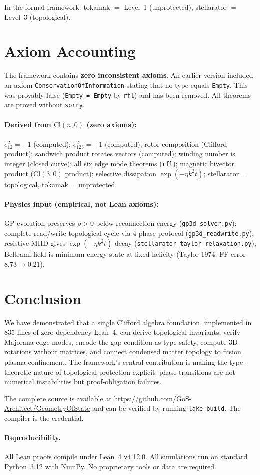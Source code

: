 \documentclass[11pt,a4paper]{article}
\newcommand{\Cl}[1]{\mathrm{Cl}(#1)}
\newcommand{\eonetwo}{e_{12}}
\newcommand{\eonetwothree}{e_{123}}
\begin{document}
In the formal framework: tokamak $=$ Level~1 (unprotected), stellarator $=$ Level~3 (topological).

\section{Axiom Accounting}

The framework contains \textbf{zero inconsistent axioms}. An earlier version included an axiom \texttt{ConservationOfInformation} stating that no type equals \texttt{Empty}. This was provably false (\texttt{Empty = Empty} by \texttt{rfl}) and has been removed. All theorems are proved without \texttt{sorry}.

\paragraph{Derived from $\Cl{n,0}$ (zero axioms):}
$\eonetwo^2 = -1$ (computed); $\eonetwothree^2 = -1$ (computed); rotor composition (Clifford product); sandwich product rotates vectors (computed); winding number is integer (closed curve); all six edge mode theorems (\texttt{rfl}); magnetic bivector product ($\Cl{3,0}$ product); selective dissipation $\exp(-\eta k^2 t)$; stellarator = topological, tokamak = unprotected.

\paragraph{Physics input (empirical, not Lean axioms):}
GP evolution preserves $\rho > 0$ below reconnection energy (\texttt{gp3d\_solver.py}); complete read/write topological cycle via 4-phase protocol (\texttt{gp3d\_readwrite.py}); resistive MHD gives $\exp(-\eta k^2 t)$ decay (\texttt{stellarator\_taylor\_relaxation.py}); Beltrami field is minimum-energy state at fixed helicity (Taylor 1974, FF error $8.73 \to 0.21$).

\section{Conclusion}

We have demonstrated that a single Clifford algebra foundation, implemented in 835 lines of zero-dependency Lean~4, can derive topological invariants, verify Majorana edge modes, encode the gap condition as type safety, compute 3D rotations without matrices, and connect condensed matter topology to fusion plasma confinement. The framework's central contribution is making the type-theoretic nature of topological protection explicit: phase transitions are not numerical instabilities but proof-obligation failures.

The complete source is available at \url{https://github.com/GoS-Architect/GeometryOfState} and can be verified by running \texttt{lake build}. The compiler is the credential.

\paragraph{Reproducibility.}
All Lean proofs compile under Lean~4 v4.12.0. All simulations run on standard Python~3.12 with NumPy. No proprietary tools or data are required.
\end{document}

